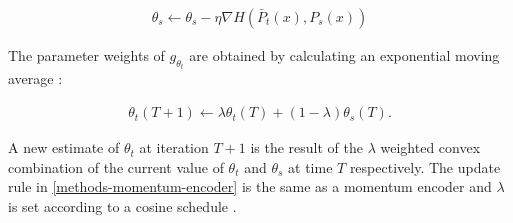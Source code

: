 \begin{align}
	\theta_s \leftarrow \theta_s - \eta \nabla H(\bar{P}_t(x),P_s(x))
\end{align}

The parameter weights of $g_{\theta_t}$ are obtained by calculating an exponential moving average \citep{Grill2020,Caron2021}: 

\begin{align}
	\theta_t(T+1) \leftarrow \lambda \theta_t(T) + (1-\lambda) \theta_s(T).
	\label{methods-momentum-encoder}
\end{align}

A new estimate of $\theta_t$ at iteration $T+1$ is the result of the $\lambda$ weighted convex combination of the current value of $\theta_t$ and $\theta_s$ at time $T$ respectively.
The update rule in \ref{methods-momentum-encoder} is the same as a momentum encoder \citep{He2019} and $\lambda$ is set according to a cosine schedule \citep{Grill2020}.
